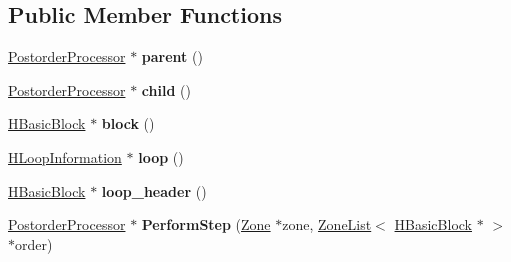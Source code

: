 \subsection*{Public Member Functions}
\begin{DoxyCompactItemize}
\item 
\hyperlink{classv8_1_1internal_1_1_postorder_processor}{Postorder\+Processor} $\ast$ {\bfseries parent} ()\hypertarget{classv8_1_1internal_1_1_postorder_processor_a9dd8ea5cd5d41e886c635f05535d046d}{}\label{classv8_1_1internal_1_1_postorder_processor_a9dd8ea5cd5d41e886c635f05535d046d}

\item 
\hyperlink{classv8_1_1internal_1_1_postorder_processor}{Postorder\+Processor} $\ast$ {\bfseries child} ()\hypertarget{classv8_1_1internal_1_1_postorder_processor_ad43b69fbb66c32b6815b889305bb1a52}{}\label{classv8_1_1internal_1_1_postorder_processor_ad43b69fbb66c32b6815b889305bb1a52}

\item 
\hyperlink{classv8_1_1internal_1_1_h_basic_block}{H\+Basic\+Block} $\ast$ {\bfseries block} ()\hypertarget{classv8_1_1internal_1_1_postorder_processor_a4ff4376a050013db2c4245de2647c80d}{}\label{classv8_1_1internal_1_1_postorder_processor_a4ff4376a050013db2c4245de2647c80d}

\item 
\hyperlink{classv8_1_1internal_1_1_h_loop_information}{H\+Loop\+Information} $\ast$ {\bfseries loop} ()\hypertarget{classv8_1_1internal_1_1_postorder_processor_a0b58299a391ea21e89a77d4c130a2f76}{}\label{classv8_1_1internal_1_1_postorder_processor_a0b58299a391ea21e89a77d4c130a2f76}

\item 
\hyperlink{classv8_1_1internal_1_1_h_basic_block}{H\+Basic\+Block} $\ast$ {\bfseries loop\+\_\+header} ()\hypertarget{classv8_1_1internal_1_1_postorder_processor_ac5de7ee5b4269a882cc59f0a98b55802}{}\label{classv8_1_1internal_1_1_postorder_processor_ac5de7ee5b4269a882cc59f0a98b55802}

\item 
\hyperlink{classv8_1_1internal_1_1_postorder_processor}{Postorder\+Processor} $\ast$ {\bfseries Perform\+Step} (\hyperlink{classv8_1_1internal_1_1_zone}{Zone} $\ast$zone, \hyperlink{classv8_1_1internal_1_1_zone_list}{Zone\+List}$<$ \hyperlink{classv8_1_1internal_1_1_h_basic_block}{H\+Basic\+Block} $\ast$ $>$ $\ast$order)\hypertarget{classv8_1_1internal_1_1_postorder_processor_a8746152c2882edabc129fddf14deccce}{}\label{classv8_1_1internal_1_1_postorder_processor_a8746152c2882edabc129fddf14deccce}

\end{DoxyCompactItemize}
